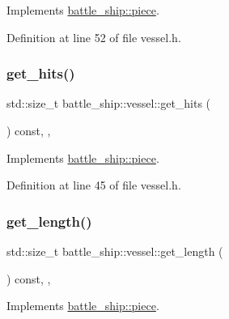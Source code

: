 Implements \hyperlink{classbattle__ship_1_1piece_a4f7ac17a3ba66f104d2c5110e0fe51d4}{battle\+\_\+ship\+::piece}.



Definition at line 52 of file vessel.\+h.

\mbox{\label{classbattle__ship_1_1vessel_a1d7fb8fe8e4454850c1cd7dbb4c70d49}} 
\subsubsection{\texorpdfstring{get\+\_\+hits()}{get\_hits()}}
{\footnotesize\ttfamily std\+::size\+\_\+t battle\+\_\+ship\+::vessel\+::get\+\_\+hits (\begin{DoxyParamCaption}{ }\end{DoxyParamCaption}) const\hspace{0.3cm}{\ttfamily [inline]}, {\ttfamily [override]}, {\ttfamily [virtual]}}



Implements \hyperlink{classbattle__ship_1_1piece_a27116e62c4ee91796349bbcb284e446d}{battle\+\_\+ship\+::piece}.



Definition at line 45 of file vessel.\+h.

\mbox{\label{classbattle__ship_1_1vessel_a96d84d8ad107db77ae601d4e29471dde}} 
\subsubsection{\texorpdfstring{get\+\_\+length()}{get\_length()}}
{\footnotesize\ttfamily std\+::size\+\_\+t battle\+\_\+ship\+::vessel\+::get\+\_\+length (\begin{DoxyParamCaption}{ }\end{DoxyParamCaption}) const\hspace{0.3cm}{\ttfamily [inline]}, {\ttfamily [override]}, {\ttfamily [virtual]}}



Implements \hyperlink{classbattle__ship_1_1piece_a08cfb1d99d1804f42f87878bef19e7ff}{battle\+\_\+ship\+::piece}.



